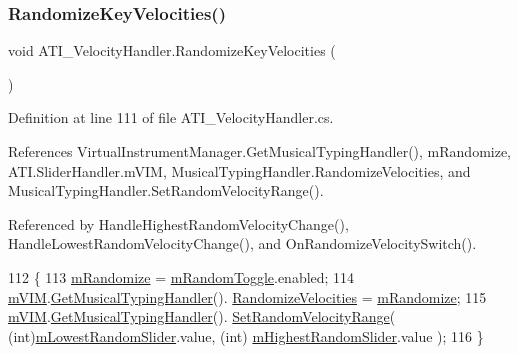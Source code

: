 \subsubsection{\texorpdfstring{Randomize\+Key\+Velocities()}{RandomizeKeyVelocities()}}
{\footnotesize\ttfamily void A\+T\+I\+\_\+\+Velocity\+Handler.\+Randomize\+Key\+Velocities (\begin{DoxyParamCaption}{ }\end{DoxyParamCaption})\hspace{0.3cm}{\ttfamily [private]}}



Definition at line 111 of file A\+T\+I\+\_\+\+Velocity\+Handler.\+cs.



References Virtual\+Instrument\+Manager.\+Get\+Musical\+Typing\+Handler(), m\+Randomize, A\+T\+I.\+Slider\+Handler.\+m\+V\+IM, Musical\+Typing\+Handler.\+Randomize\+Velocities, and Musical\+Typing\+Handler.\+Set\+Random\+Velocity\+Range().



Referenced by Handle\+Highest\+Random\+Velocity\+Change(), Handle\+Lowest\+Random\+Velocity\+Change(), and On\+Randomize\+Velocity\+Switch().


\begin{DoxyCode}
112     \{
113         \hyperlink{class_a_t_i___velocity_handler_aa6f4ac16382d37eb2c66fb358ac87301}{mRandomize} = \hyperlink{class_a_t_i___velocity_handler_a6ca709a10f8b2eb0f1141c589e7f9742}{mRandomToggle}.enabled;
114         \hyperlink{class_a_t_i_1_1_slider_handler_a5d19b4fb92b71c25a667defdda60213f}{mVIM}.\hyperlink{group___v_i_m_pub_func_gae6701458a23a3f14db90501f871d4d0d}{GetMusicalTypingHandler}().
      \hyperlink{group___mus_typ_pub_var_gad09f6f673034d9cd95f699838c9518d5}{RandomizeVelocities} = \hyperlink{class_a_t_i___velocity_handler_aa6f4ac16382d37eb2c66fb358ac87301}{mRandomize};
115         \hyperlink{class_a_t_i_1_1_slider_handler_a5d19b4fb92b71c25a667defdda60213f}{mVIM}.\hyperlink{group___v_i_m_pub_func_gae6701458a23a3f14db90501f871d4d0d}{GetMusicalTypingHandler}().
      \hyperlink{group___mus_typ_pub_func_gaf6ba35e3a081cff62fa963ed32d218c8}{SetRandomVelocityRange}( (\textcolor{keywordtype}{int})\hyperlink{class_a_t_i___velocity_handler_aba4ceb157ad404a47cedb3583e81d194}{mLowestRandomSlider}.value, (\textcolor{keywordtype}{int})
      \hyperlink{class_a_t_i___velocity_handler_aec243511d869243292e215a24e87f192}{mHighestRandomSlider}.value );
116     \}
\end{DoxyCode}
\mbox{\label{class_a_t_i___velocity_handler_a76342d6f2b240a3007b20b9539e4c7a6}} 
